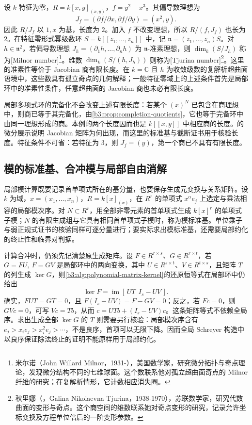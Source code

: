 \begin{example}\label{b3:exm:F-jacobian-quotients}
	设 \(k\) 特征为零，\(R=k[x,y]_{(x,y)}\)，\(f=y^2-x^3\)。其偏导数理想为
	\[
		J_f=(\partial f/\partial x,\partial f/\partial y)=(x^2,y).
	\]
	因此 \(R/J_f\) 以 \(1,x\) 为基，长度为 \(2\)。加入 \(f\) 不改变理想，所以 \(R/(f,J_f)\) 也长为 \(2\)。在特征零形式幂级数环 \(S=k[\![z_1,\ldots,z_n]\!]\) 中，记 \(\mathfrak n=(z_1,\ldots,z_n)S\)。对 \(h\in\mathfrak n^2\)，若偏导数理想 \(J_h=(\partial_1h,\ldots,\partial_nh)\) 为 \(\mathfrak n\)-准素理想，则 \(\dim_k(S/J_h)\) 称为[Milnor number]\footnote{米尔诺（John Willard Milnor，1931-），美国数学家，研究微分拓扑与奇点理论，发现微分结构不同的七维球面。这个数联系他对孤立超曲面奇点的 Milnor 纤维的研究；在复解析情形，它计数相应消失圈。}。维数 \(\dim_k(S/(h,J_h))\) 则称为[Tjurina number]\footnote{秋里娜（，Galina Nikolaevna Tjurina，1938-1970），苏联数学家，研究代数曲面的变形与奇点。这个商空间的维数联系她对奇点变形的研究，记录允许坐标变换及方程单位倍后的一阶变形参数。}。这里的准素性等价于 Jacobian 商有限长度。在 \(k=\mathbb C\) 且 \(h\) 为收敛级数的复解析超曲面语境中，这些数具有孤立奇点的几何解释；一般特征零域上的上述条件首先是局部环中的准素性条件，任意超曲面的 Jacobian 商也未必有限长度。

	局部多项式环的完备化不会改变上述有限长度：若某个 \((x)^N\) 已包含在商理想中，则商已等于其完备化，由\cref{b3:prop:completion-quotients}，它也等于完备环中由同一理想形成的商。本例的两个长度因而也是 \(k[\![x,y]\!]\) 中相应商的长度。的微分展示说明 Jacobian 矩阵为何出现，而这里的标准基与截断证书用于核验长度。特征条件不可省：若特征为 \(3\)，则 \(J_f=(y)\)，第一个商已不具有有限长度。
\end{example}

\subsection{模的标准基、合冲模与局部自由消解}
\label{b3:subsec:F04:02}

局部模计算既要记录首单项式所在的基分量，也要保存生成元变换与关系矩阵。设 \(k\) 为域，\(x=(x_1,\ldots,x_n)\)，\(R=k[x]_{(x)}\)，在 \(R^r\) 的单项式 \(x^\alpha e_j\) 上选定与乘法相容的局部模次序。对 \(N\subset R^r\)，用全部非零元素的首单项式生成 \(k[x]^r\) 的单项式子模；\(N\) 的有限生成组与它具有相同首单项式子模时，称为模标准基。单位乘子与弱正规式证书的核验同样可逐分量进行；要实际求出模标准基，还需要局部约化的终止性和临界对判据。

\ProseParagraphBreak
计算合冲时，仍须先记清楚原生成矩阵。设 \(F\in R^{r\times s}\)、\(G\in R^{r\times t}\)，若 \(G=FU,\ F=GV\) 是局部环中的两向变换，其中 \(U\in R^{s\times t}\)、\(V\in R^{t\times s}\)，且矩阵 \(T\) 的列生成 \(\ker G\)，则\cref{b3:alg:polynomial-matrix-kernel}的还原恒等式在局部环中仍给出
\[
	\ker F=\operatorname{im}[\,UT\ \ I_s-UV\,].
\]
确实，\(FUT=GT=0\)，且 \(F(I_s-UV)=F-GV=0\)；反之，若 \(Fc=0\)，则 \(GVc=0\)，可写 \(Vc=Tb\)，从而 \(c=UTb+(I_s-UV)c\)。这条矩阵等式不依赖全局序。求出生成全部 \(\ker G\) 的 \(T\) 则需要另行核验：局部模次序含有 \(e_j>x_i e_j>x_i^2e_j>\cdots\)，不是良序，首项可以无限下降。因而全局 Schreyer 构造中以良序保证除法终止的证明不能原样用于局部约化。

